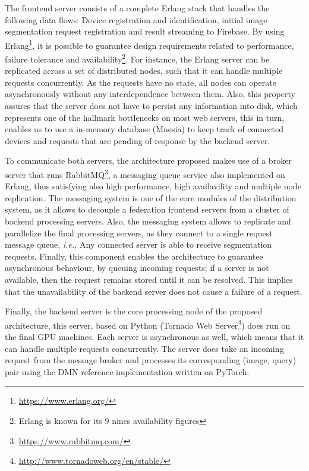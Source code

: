 The frontend server consists of a complete Erlang stack that handles the following data flows: Device registration and identification, initial image segmentation request registration and result streaming to Firebase. By using Erlang\footnote{\url{https://www.erlang.org/}}, it is possible to guarantee design requirements related to performance, failure tolerance and availability\footnote{Erlang is known for its 9 nines availability figures}. For instance, the Erlang server can be replicated across a set of distributed nodes, such that it can handle multiple requests concurrently. As the requests have no state, all nodes can operate asynchronously without any interdependence between them. Also, this property assures that the server does not have to persist any information into disk, which represents one of the hallmark bottlenecks on most web servers, this in turn, enables us to use a in-memory database (Mnesia) to keep track of connected devices and requests that are pending of response by the backend server. 

To communicate both servers, the architecture proposed makes use of a broker server that runs RabbitMQ\footnote{\url{https://www.rabbitmq.com/}}, a messaging queue service also implemented on Erlang, thus satisfying also high performance, high availavility and multiple node replication. The messaging system is one of the core modules of the distribution system, as it allows to decouple a federation frontend servers from a cluster of backend processing servers. Also, the messaging system allows to replicate and parallelize the final processing servers, as they connect to a single request message queue, \textit{i.e.,} Any connected server is able to receive segmentation requests. Finally, this component enables the architecture to guarantee asynchronous behaviour, by queuing incoming requests; if a server is not available, then the request remains stored until it can be resolved. This implies that the unavailability of the backend server does not cause a failure of a request.

Finally, the backend server is the core processing node of the proposed architecture, this server, based on Python (Tornado Web Server\footnote{\url{http://www.tornadoweb.org/en/stable/}}) does run on the final GPU machines. Each server is asynchronous as well, which means that it can handle multiple requests concurrently. The server does take an incoming request from the message broker and processes its corresponding (image, query) pair using the DMN reference implementation written on PyTorch.

